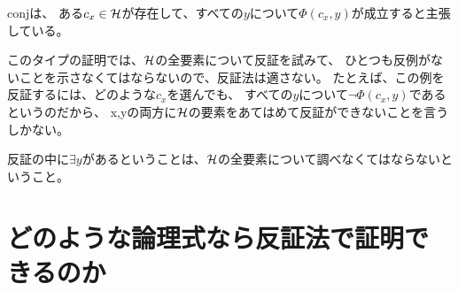 \documentclass[10pt, oneside]{jarticle}   	%
\begin{document}
conjは、
ある$c_x \in \mathcal{H}$が存在して、すべての$y$について$\Phi(c_x, y)$が成立すると主張している。

このタイプの証明では、$\mathcal{H}$の全要素について反証を試みて、
ひとつも反例がないことを示さなくてはならないので、反証法は適さない。
たとえば、この例を反証するには、どのような$c_x$を選んでも、
すべての$y$について$\neg \Phi(c_x, y)$であるというのだから、
x,yの両方に$\mathcal{H}$の要素をあてはめて反証ができないことを言うしかない。

反証の中に$\exists y$があるということは、$\mathcal{H}$の全要素について調べなくてはならないということ。


\section{どのような論理式なら反証法で証明できるのか}
\end{document}
